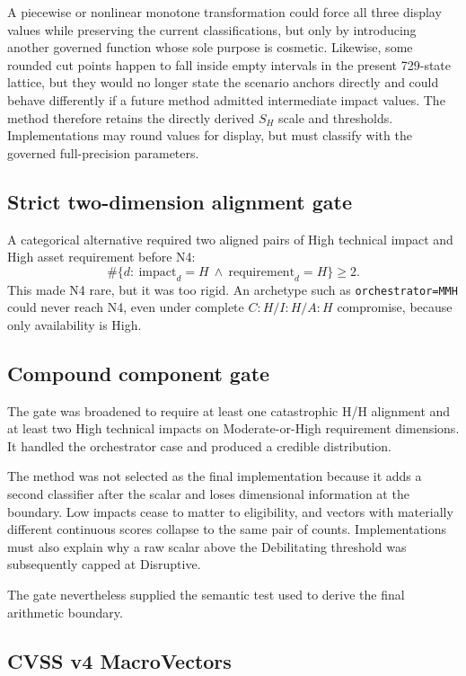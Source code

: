 \documentclass[11pt]{article}
\newcommand{\code}[1]{\texttt{#1}}
\begin{document}
A piecewise or nonlinear monotone transformation could force all three display
values while preserving the current classifications, but only by introducing
another governed function whose sole purpose is cosmetic. Likewise, some rounded
cut points happen to fall inside empty intervals in the present 729-state lattice,
but they would no longer state the scenario anchors directly and could behave
differently if a future method admitted intermediate impact values. The method
therefore retains the directly derived $S_H$ scale and thresholds. Implementations
may round values for display, but must classify with the governed full-precision
parameters.

\subsection{Strict two-dimension alignment gate}

A categorical alternative required two aligned pairs of High technical impact and
High asset requirement before N4:
\[
\#\{d:\ \mathrm{impact}_d=H\ \land\ \mathrm{requirement}_d=H\}\ge2.
\]
This made N4 rare, but it was too rigid. An archetype such as
\code{orchestrator=MMH} could never reach N4, even under complete
$C{:}H/I{:}H/A{:}H$ compromise, because only availability is High.

\subsection{Compound component gate}

The gate was broadened to require at least one catastrophic H/H alignment and at
least two High technical impacts on Moderate-or-High requirement dimensions. It
handled the orchestrator case and produced a credible distribution.

The method was not selected as the final implementation because it adds a second
classifier after the scalar and loses dimensional information at the boundary.
Low impacts cease to matter to eligibility, and vectors with materially different
continuous scores collapse to the same pair of counts. Implementations must also
explain why a raw scalar above the Debilitating threshold was subsequently capped
at Disruptive.

The gate nevertheless supplied the semantic test used to derive the final
arithmetic boundary.

\subsection{CVSS v4 MacroVectors}
\end{document}
